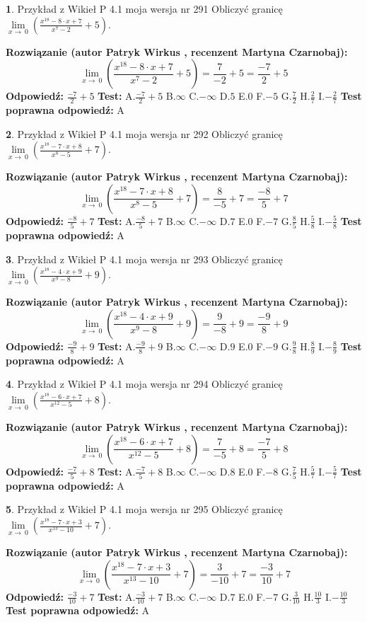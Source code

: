 \documentclass[12pt, a4paper]{article}
\theoremstyle{definition} %
\newtheorem{zad}{}
\newcommand{\zadStart}[1]{\begin{zad}#1\newline}
\newcommand{\zadStop}{\end{zad}}
\newcommand{\rozwStart}[2]{\noindent \textbf{Rozwiązanie (autor #1 , recenzent #2): }\newline}
\newcommand{\rozwStop}{\newline}
\newcommand{\odpStart}{\noindent \textbf{Odpowiedź:}\newline}
\newcommand{\odpStop}{\newline}
\newcommand{\testStart}{\noindent \textbf{Test:}\newline}
\newcommand{\testStop}{\newline}
\newcommand{\kluczStart}{\noindent \textbf{Test poprawna odpowiedź:}\newline}
\newcommand{\kluczStop}{\newline}
\begin{document}
\zadStart{Przykład z Wikieł P 4.1 moja wersja nr 291}
Obliczyć granicę $\lim\limits_{x\to\ 0}(\frac{x^{18}-8 \cdot x +7}{x^{7}-2}+5)$.
\zadStop
\rozwStart{Patryk Wirkus}{Martyna Czarnobaj}
$$\lim\limits_{x\to\ 0}(\frac{x^{18}-8 \cdot x +7}{x^{7}-2}+5)=\frac{7}{-2}+5=\frac{-7}{2}+5$$
\rozwStop
\odpStart
$\frac{-7}{2}+5$
\odpStop
\testStart
A.$\frac{-7}{2}+5$
B.$\infty$
C.$-\infty$
D.$5$
E.$0$
F.$-5$
G.$\frac{7}{2}$
H.$\frac{2}{7}$
I.$-\frac{2}{7}$
\testStop
\kluczStart
A
\kluczStop



\zadStart{Przykład z Wikieł P 4.1 moja wersja nr 292}
Obliczyć granicę $\lim\limits_{x\to\ 0}(\frac{x^{18}-7 \cdot x +8}{x^{8}-5}+7)$.
\zadStop
\rozwStart{Patryk Wirkus}{Martyna Czarnobaj}
$$\lim\limits_{x\to\ 0}(\frac{x^{18}-7 \cdot x +8}{x^{8}-5}+7)=\frac{8}{-5}+7=\frac{-8}{5}+7$$
\rozwStop
\odpStart
$\frac{-8}{5}+7$
\odpStop
\testStart
A.$\frac{-8}{5}+7$
B.$\infty$
C.$-\infty$
D.$7$
E.$0$
F.$-7$
G.$\frac{8}{5}$
H.$\frac{5}{8}$
I.$-\frac{5}{8}$
\testStop
\kluczStart
A
\kluczStop



\zadStart{Przykład z Wikieł P 4.1 moja wersja nr 293}
Obliczyć granicę $\lim\limits_{x\to\ 0}(\frac{x^{18}-4 \cdot x +9}{x^{9}-8}+9)$.
\zadStop
\rozwStart{Patryk Wirkus}{Martyna Czarnobaj}
$$\lim\limits_{x\to\ 0}(\frac{x^{18}-4 \cdot x +9}{x^{9}-8}+9)=\frac{9}{-8}+9=\frac{-9}{8}+9$$
\rozwStop
\odpStart
$\frac{-9}{8}+9$
\odpStop
\testStart
A.$\frac{-9}{8}+9$
B.$\infty$
C.$-\infty$
D.$9$
E.$0$
F.$-9$
G.$\frac{9}{8}$
H.$\frac{8}{9}$
I.$-\frac{8}{9}$
\testStop
\kluczStart
A
\kluczStop



\zadStart{Przykład z Wikieł P 4.1 moja wersja nr 294}
Obliczyć granicę $\lim\limits_{x\to\ 0}(\frac{x^{18}-6 \cdot x +7}{x^{12}-5}+8)$.
\zadStop
\rozwStart{Patryk Wirkus}{Martyna Czarnobaj}
$$\lim\limits_{x\to\ 0}(\frac{x^{18}-6 \cdot x +7}{x^{12}-5}+8)=\frac{7}{-5}+8=\frac{-7}{5}+8$$
\rozwStop
\odpStart
$\frac{-7}{5}+8$
\odpStop
\testStart
A.$\frac{-7}{5}+8$
B.$\infty$
C.$-\infty$
D.$8$
E.$0$
F.$-8$
G.$\frac{7}{5}$
H.$\frac{5}{7}$
I.$-\frac{5}{7}$
\testStop
\kluczStart
A
\kluczStop



\zadStart{Przykład z Wikieł P 4.1 moja wersja nr 295}
Obliczyć granicę $\lim\limits_{x\to\ 0}(\frac{x^{18}-7 \cdot x +3}{x^{13}-10}+7)$.
\zadStop
\rozwStart{Patryk Wirkus}{Martyna Czarnobaj}
$$\lim\limits_{x\to\ 0}(\frac{x^{18}-7 \cdot x +3}{x^{13}-10}+7)=\frac{3}{-10}+7=\frac{-3}{10}+7$$
\rozwStop
\odpStart
$\frac{-3}{10}+7$
\odpStop
\testStart
A.$\frac{-3}{10}+7$
B.$\infty$
C.$-\infty$
D.$7$
E.$0$
F.$-7$
G.$\frac{3}{10}$
H.$\frac{10}{3}$
I.$-\frac{10}{3}$
\testStop
\kluczStart
A
\kluczStop
\end{document}
